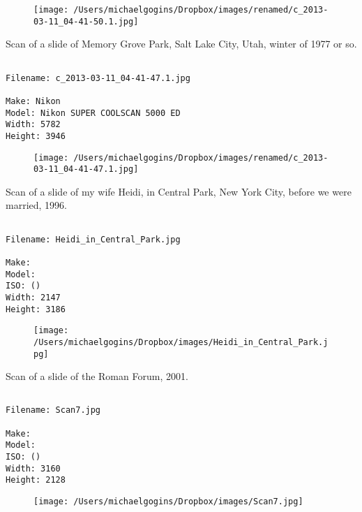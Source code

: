 \begin{figure}
\texttt{[image: /Users/michaelgogins/Dropbox/images/renamed/c\_2013-03-11\_04-41-50.1.jpg]}
\end{figure}
    
\clearpage
\onecolumn
\noindent Scan of a slide of Memory Grove Park, Salt Lake City, Utah, winter of 1977 or so.
\noindent
\begin{lstlisting}

Filename: c_2013-03-11_04-41-47.1.jpg

Make: Nikon
Model: Nikon SUPER COOLSCAN 5000 ED
Width: 5782
Height: 3946
\end{lstlisting}
\clearpage

\begin{figure}
\texttt{[image: /Users/michaelgogins/Dropbox/images/renamed/c\_2013-03-11\_04-41-47.1.jpg]}
\end{figure}
    
\clearpage
\onecolumn
\noindent Scan of a slide of my wife Heidi, in Central Park, New York City, before we were married, 1996.
\noindent
\begin{lstlisting}

Filename: Heidi_in_Central_Park.jpg

Make: 
Model: 
ISO: ()
Width: 2147
Height: 3186
\end{lstlisting}
\clearpage

\begin{figure}
\texttt{[image: /Users/michaelgogins/Dropbox/images/Heidi\_in\_Central\_Park.jpg]}
\end{figure}
    
\clearpage
\onecolumn
\noindent Scan of a slide of the Roman Forum, 2001.
\noindent
\begin{lstlisting}

Filename: Scan7.jpg

Make: 
Model: 
ISO: ()
Width: 3160
Height: 2128
\end{lstlisting}
\clearpage

\begin{figure}
\texttt{[image: /Users/michaelgogins/Dropbox/images/Scan7.jpg]}
\end{figure}
    
